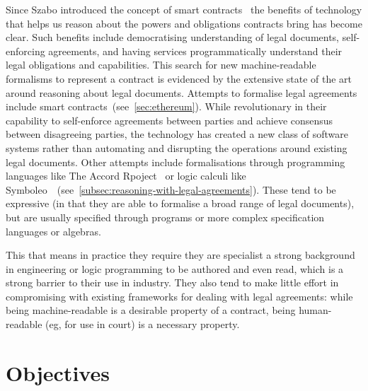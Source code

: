 Since Szabo introduced the concept of smart contracts~\cite{szabo1997smart-contracts} the benefits of technology that helps us reason about the powers and obligations contracts bring has become clear.
Such benefits include democratising understanding of legal documents, self-enforcing agreements, and having services programmatically understand their legal obligations and capabilities.
This search for new machine-readable formalisms to represent a contract is evidenced by the extensive state of the art around reasoning about legal documents.
Attempts to formalise legal agreements include smart contracts~(see~\autoref{sec:ethereum}).
While revolutionary in their capability to self-enforce agreements between parties and achieve consensus between disagreeing parties, the technology has created a new class of software systems rather than automating and disrupting the operations around existing legal documents.
Other attempts include formalisations through programming languages like The Accord Rpoject~\cite{accordHomepage} or logic calculi like Symboleo~\cite{symboleo2020}~(see~\autoref{subsec:reasoning-with-legal-agreements}).
These tend to be expressive (in that they are able to formalise a broad range of legal documents),
but are usually specified through programs or more complex specification languages or algebras.

This that means in practice they require they are specialist a strong background in engineering or logic programming to be authored and even read, which is a strong barrier to their use in industry.
They also tend to make little effort in compromising with existing frameworks for dealing with legal agreements: while being machine-readable is a desirable property of a contract, being human-readable (eg, for use in court) is a necessary property.


\section{Objectives}\label{sec:objectives}


